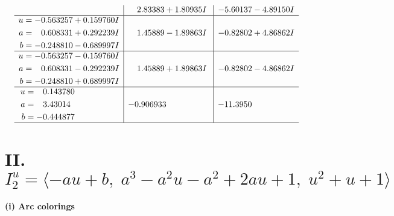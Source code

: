 \documentclass[1p]{elsarticle_modified}
\theoremstyle{definition}
\begin{document}
$$\begin{array}{c|c|c}
 & \phantom{-}2.83383 + 1.80935 I & -5.60137 - 4.89150 I \\ \hline\begin{aligned}
u &= -0.563257 + 0.159760 I \\
a &= \phantom{-}0.608331 + 0.292239 I \\
b &= -0.248810 - 0.689997 I\end{aligned}
 & \phantom{-}1.45889 - 1.89863 I & -0.82802 + 4.86862 I \\ \hline\begin{aligned}
u &= -0.563257 - 0.159760 I \\
a &= \phantom{-}0.608331 - 0.292239 I \\
b &= -0.248810 + 0.689997 I\end{aligned}
 & \phantom{-}1.45889 + 1.89863 I & -0.82802 - 4.86862 I \\ \hline\begin{aligned}
u &= \phantom{-}0.143780\phantom{ +0.000000I} \\
a &= \phantom{-}3.43014\phantom{ +0.000000I} \\
b &= -0.444877\phantom{ +0.000000I}\end{aligned}
 & -0.906933\phantom{ +0.000000I} & -11.3950\phantom{ +0.000000I}\\
 \hline 
 \end{array}$$\newpage\newpage\renewcommand{\arraystretch}{1}
\centering \section*{II. $I^u_{2}= \langle - a u+b,\;a^3- a^2 u- a^2+2 a u+1,\;u^2+u+1 \rangle$}
\flushleft \textbf{(i) Arc colorings}\\
\end{document}
